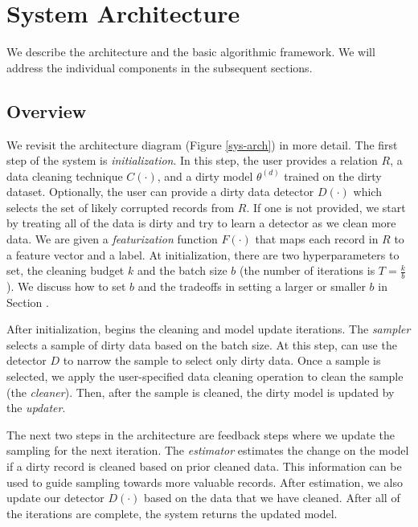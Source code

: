 \section{System Architecture}\label{arch}
We describe the \sys architecture and the basic algorithmic framework.
We will address the individual components in the subsequent sections.

\subsection{Overview}
We revisit the architecture diagram (Figure \ref{sys-arch}) in more detail.
The first step of the system is \emph{initialization}.
In this step, the user provides a relation $R$, a data cleaning technique $C(\cdot)$, and a dirty model $\theta^{(d)}$ trained on the dirty dataset. 
Optionally, the user can provide a dirty data detector $D(\cdot)$ which selects the set of likely corrupted records from $R$.
If one is not provided, we start by treating all of the data is dirty and try to learn a detector as we clean more data.
We are given a \emph{featurization} function $F(\cdot)$ that maps each record in $R$ to a feature vector and a label.
At initialization, there are two hyperparameters to set, the cleaning budget $k$ and the batch size $b$ (the number of iterations is $T = \frac{k}{b}$).
We discuss how to set $b$ and the tradeoffs in setting a larger or smaller $b$ in Section \label{model-update}.

After initialization, \sys begins the cleaning and model update iterations.
The \emph{sampler} selects a sample of dirty data based on the batch size.
At this step, \sys can use the detector $D$ to narrow the sample to select only dirty data.
Once a sample is selected, we apply the user-specified data cleaning operation to clean the sample (the \emph{cleaner}).
Then, after the sample is cleaned, the dirty model is updated by the \emph{updater}.

The next two steps in the architecture are feedback steps where we update the sampling for the next iteration.
The \emph{estimator} estimates the change on the model if a dirty record is cleaned based on prior cleaned data.
This information can be used to guide sampling towards more valuable records.
After estimation, we also update our detector $D(\cdot)$ based on the data that we have cleaned.
After all of the iterations are complete, the system returns the updated model.

